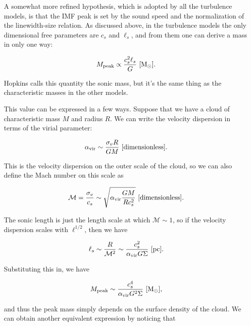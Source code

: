 \documentclass[a4paper,10pt]{article}
\begin{document}
{\noindent}A somewhat more refined hypothesis, which is adopted by all the turbulence models, is that the IMF peak is set by the sound speed and the normalization of the linewidth-size relation. As discussed above, in the turbulence models the only dimensional free parameters are $c_s$ and $\ell_s$, and from them one can derive a mass in only one way:

\begin{align*}
    M_\mathrm{peak} \propto \frac{c_s^2\ell_s}{G} ~ [{\rm M_\odot}].
\end{align*}

{\noindent}Hopkins calls this quantity the sonic mass, but it’s the same thing as the characteristic masses in the other models.

{\noindent}This value can be expressed in a few ways. Suppose that we have a cloud of characteristic mass $M$ and radius $R$. We can write the velocity dispersion in terms of the virial parameter:

\begin{align*}
    \alpha_\mathrm{vir} \sim \frac{\sigma_vR}{GM} ~ [{\rm dimensionless}].
\end{align*}

{\noindent}This is the velocity dispersion on the outer scale of the cloud, so we can also define the Mach number on this scale as

\begin{align*}
    \mathcal{M} = \frac{\sigma_v}{c_s} \sim \sqrt{\alpha_\mathrm{vir}\frac{GM}{Rc_s^2}} ~ [{\rm dimensionless}].
\end{align*}

{\noindent}The sonic length is just the length scale at which $\mathcal{M}\sim1$, so if the velocity dispersion scales with $\ell^{1/2}$, then we have

\begin{align*}
    \ell_s \sim \frac{R}{\mathcal{M}^2} \sim \frac{c_s^2}{\alpha_\mathrm{vir}G\Sigma} ~ [{\rm pc}].
\end{align*}

{\noindent}Substituting this in, we have

\begin{align*}
    M_\mathrm{peak} \sim \frac{c_s^4}{\alpha_\mathrm{vir}G^2\Sigma} ~ [{\rm M_\odot}],
\end{align*}

{\noindent}and thus the peak mass simply depends on the surface density of the cloud. We can obtain another equivalent expression by noticing that
\end{document}
